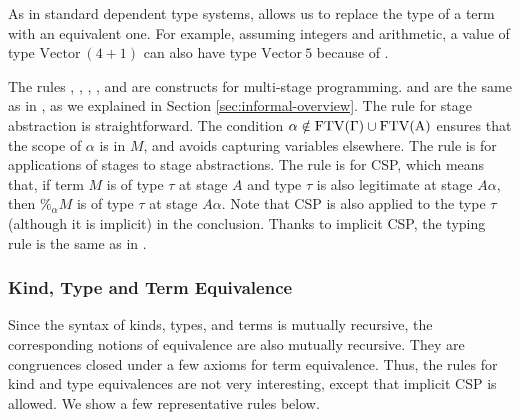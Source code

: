 
As in standard dependent type systems, \TConv{} allows us to replace the type
of a term with an equivalent one. For example, assuming integers and
arithmetic, a value of type $\textrm{Vector}\ (4+1)$ can also have type
$\textrm{Vector}\ 5$ because of \TConv{}.


The rules \TTB, \TTBL, \TGen, \TIns, and \TCsp{} are constructs for multi-stage
programming. \TTB{} and \TTBL{} are the same as in \LTP, as we explained in
Section \ref{sec:informal-overview}. The rule \TGen{} for stage abstraction is
straightforward. The condition $\alpha\notin\rm{FTV}(\Gamma)\cup\rm{FTV}(A)$
ensures that the scope of $\alpha$ is in $M$, and avoids capturing variables
elsewhere. The rule \TIns{} is for applications of stages to stage
abstractions. The rule \TCsp{} is for CSP, which means that, if term $M$ is of
type $\tau$ at stage $A$ and type \( \tau \) is also legitimate at stage \(
A\alpha \), then $\%_\alpha M$ is of type $\tau$ at stage $A\alpha$. Note that
CSP is also applied to the type \(\tau\) (although it is implicit) in the
conclusion. Thanks to implicit CSP, the typing rule is the same as in \LTP.

\subsubsection{Kind, Type and Term Equivalence}

Since the syntax of kinds, types, and terms is mutually recursive, the
corresponding notions of equivalence are also mutually recursive.  They are
congruences closed under a few axioms for term equivalence.  Thus, the rules
for kind and type equivalences are not very interesting, except that implicit
CSP is allowed.  We show a few representative rules below.

\begin{center}
        \hfil
        \\[2mm]
\end{center}


